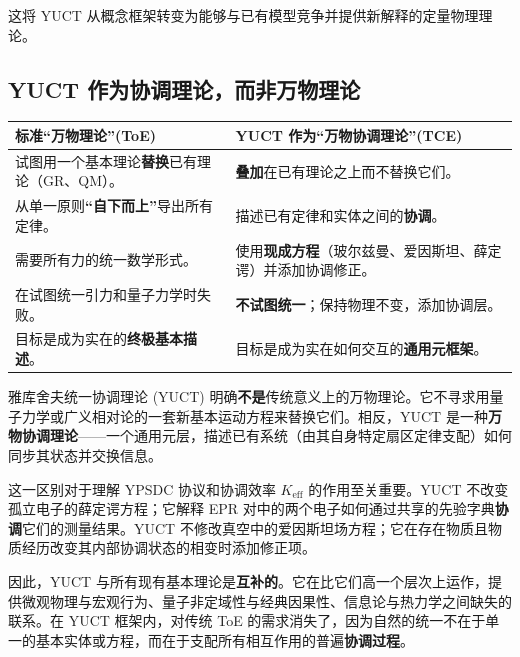 \documentclass[11pt,a4paper]{article}
\begin{document}
	这将 YUCT 从概念框架转变为能够与已有模型竞争并提供新解释的定量物理理论。
	
	\subsection{YUCT 作为协调理论，而非万物理论}
	\label{subsec:not-toe}
	
	\begin{tcolorbox}[title=YUCT 与标准万物理论 (ToE) 的对比, 
		colback=blue!5!white, colframe=blue!50!black, 
		fonttitle=\bfseries, sharp corners]
		\small
		\begin{table}[H]
			\centering
			\begin{tabular}{p{0.45\textwidth} p{}}
				\toprule
				\textbf{标准“万物理论”(ToE)} & \textbf{YUCT 作为“万物协调理论”(TCE)} \\
				\midrule
				试图用一个基本理论\textbf{替换}已有理论（GR、QM）。 & \textbf{叠加}在已有理论之上而不替换它们。 \\
				\addlinespace
				从单一原则\textbf{“自下而上”}导出所有定律。 & 描述已有定律和实体之间的\textbf{协调}。 \\
				\addlinespace
				需要所有力的统一数学形式。 & 使用\textbf{现成方程}（玻尔兹曼、爱因斯坦、薛定谔）并添加协调修正。 \\
				\addlinespace
				在试图统一引力和量子力学时失败。 & \textbf{不试图统一}；保持物理不变，添加协调层。 \\
				\addlinespace
				目标是成为实在的\textbf{终极基本描述}。 & 目标是成为实在如何交互的\textbf{通用元框架}。 \\
				\bottomrule
			\end{tabular}
		\end{table}
	\end{tcolorbox}
	
	\vspace{0.5cm}
	\noindent
	雅库舍夫统一协调理论 (YUCT) 明确\textbf{不是}传统意义上的万物理论。它不寻求用量子力学或广义相对论的一套新基本运动方程来替换它们。相反，YUCT 是一种\textbf{万物协调理论}——一个通用元层，描述已有系统（由其自身特定扇区定律支配）如何同步其状态并交换信息。
	
	这一区别对于理解 YPSDC 协议和协调效率 $K_{\mathrm{eff}}$ 的作用至关重要。YUCT 不改变孤立电子的薛定谔方程；它解释 EPR 对中的两个电子如何通过共享的先验字典\textbf{协调}它们的测量结果。YUCT 不修改真空中的爱因斯坦场方程；它在存在物质且物质经历改变其内部协调状态的相变时添加修正项。
	
	因此，YUCT 与所有现有基本理论是\textbf{互补的}。它在比它们高一个层次上运作，提供微观物理与宏观行为、量子非定域性与经典因果性、信息论与热力学之间缺失的联系。在 YUCT 框架内，对传统 ToE 的需求消失了，因为自然的统一不在于单一的基本实体或方程，而在于支配所有相互作用的普遍\textbf{协调过程}。
	
\end{document}
